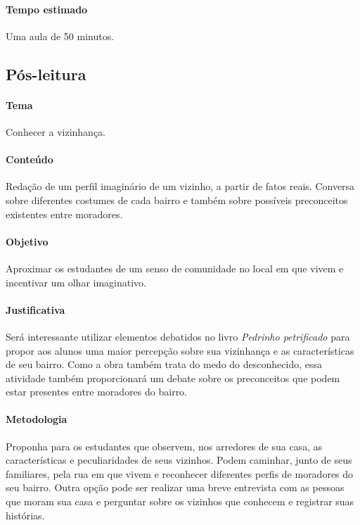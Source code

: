 \documentclass[11pt]{extarticle}
\begin{document}
\paragraph{Tempo estimado} Uma aula de 50 minutos.

\subsection{Pós-leitura}


\paragraph{Tema} Conhecer a vizinhança.

\paragraph{Conteúdo} Redação de um perfil imaginário de um vizinho, a partir de fatos reais. Conversa sobre diferentes costumes de cada bairro e também sobre possíveis preconceitos existentes entre moradores.

\paragraph{Objetivo} Aproximar os estudantes de um senso de comunidade no local em que vivem e incentivar um olhar imaginativo.

\paragraph{Justificativa} Será interessante utilizar elementos debatidos no livro \textit{Pedrinho petrificado} para propor aos alunos uma maior percepção sobre sua vizinhança e as características de seu bairro. Como a obra também trata do medo do desconhecido, essa atividade também proporcionará um debate sobre os preconceitos que podem estar presentes entre moradores do bairro.

\paragraph{Metodologia} Proponha para os estudantes que observem, nos arredores de sua casa, as características e peculiaridades de seus vizinhos. Podem caminhar, junto de seus familiares, pela rua em que vivem e reconhecer diferentes perfis de moradores do seu bairro. Outra opção pode ser realizar uma breve entrevista com as pessoas que moram sua casa e perguntar sobre os vizinhos que conhecem e registrar suas histórias.
\end{document}
